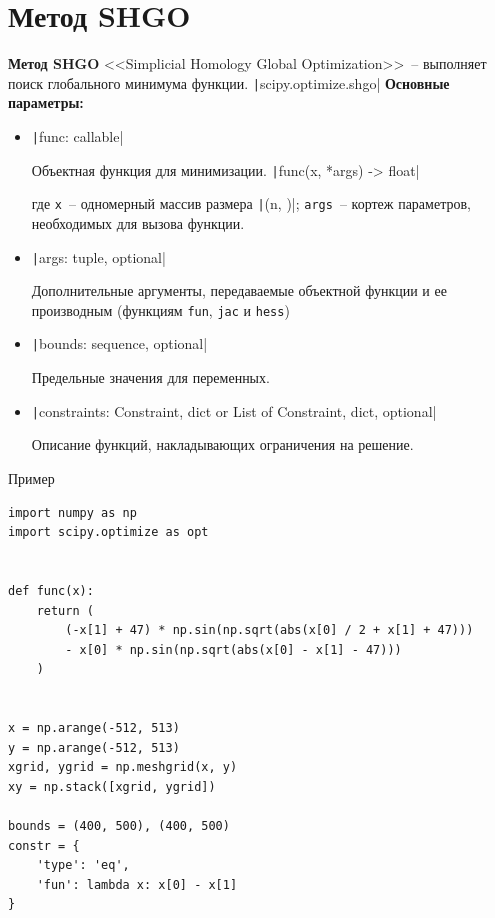 \documentclass[aspectratio=169, mathserif]{beamer}%
\begin{document}
\section{Метод SHGO}
\begin{frame}[fragile, label=c]{\textbf{Метод SHGO}}
\scriptsize
<<Simplicial Homology Global Optimization>>~-- выполняет поиск глобального минимума функции.
\texttt|scipy.optimize.shgo|
\vfill
\textcolor{tpugreen}{\textbf{Основные параметры:}}
\vfill
\begin{itemize}
\item[] \texttt|func: callable|

Объектная функция для минимизации.
\vfill
\texttt|func(x, *args) -> float|

где \texttt{x}~-- одномерный массив размера \texttt|(n, )|; \texttt{args}~-- кортеж параметров, необходимых для вызова функции.
\vfill
\item[] \texttt|args: tuple, optional|

Дополнительные аргументы, передаваемые объектной функции и ее производным (функциям \texttt{fun}, \texttt{jac} и \texttt{hess})
\vfill
\item[] \texttt|bounds: sequence, optional|

Предельные значения для переменных.
\vfill
\item[] \texttt|constraints: {Constraint, dict} or List of {Constraint, dict}, optional|

Описание функций, накладывающих ограничения на решение.
\end{itemize}
\vfill
\end{frame}


\begin{frame}[fragile, label=c]{Пример}
\scriptsize
\begin{verbatim}
import numpy as np
import scipy.optimize as opt


def func(x):
    return (
        (-x[1] + 47) * np.sin(np.sqrt(abs(x[0] / 2 + x[1] + 47)))
        - x[0] * np.sin(np.sqrt(abs(x[0] - x[1] - 47)))
    )


x = np.arange(-512, 513)
y = np.arange(-512, 513)
xgrid, ygrid = np.meshgrid(x, y)
xy = np.stack([xgrid, ygrid])

bounds = (400, 500), (400, 500)
constr = {
    'type': 'eq',
    'fun': lambda x: x[0] - x[1]
}
\end{verbatim}
\vfill
\end{frame}
\end{document}
